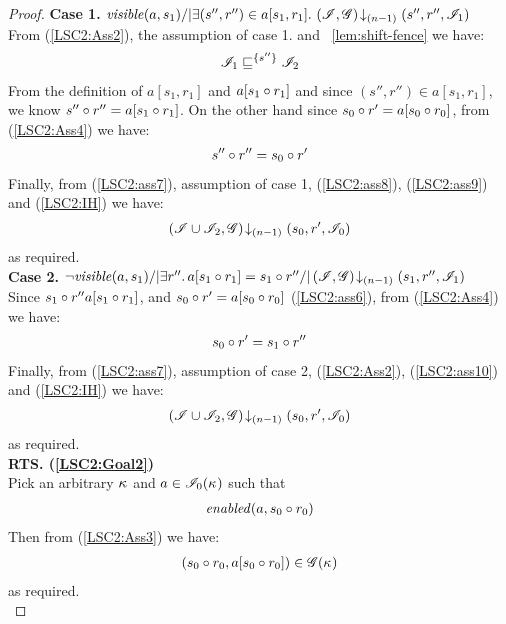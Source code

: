 \begin{lemma}
\begin{proof}
\noindent\textbf{Case 1. }
$\mathit{visible}(a, s_1) /| \exists (s'', r'') \in a[s_1, r_1].\, \left(\mathscr{I}, \mathscr{G}\right) \!\downarrow_{(n-1)} \left(s'', r'', \mathscr{I}_1\right)$\\
From (\ref{LSC2:Ass2}), the assumption of case 1. and \lem~\ref{lem:shift-fence} we have:
%
\begin{align}
	\mathscr{I}_1 \sqsubseteq^{\{s''\}} \mathscr{I}_2 \label{LSC2:ass8}
\end{align}
%
From the definition of $a[s_1, r_1]$ and $a[s_1 \circ r_1]$ and since $(s'', r'') \in a[s_1, r_1]$, we know $s'' \circ r'' = a[s_1 \circ r_1]$. On the other hand since $s_0 \circ r' = a[s_0 \circ r_0]$, from (\ref{LSC2:Ass4}) we have:
%
\begin{align}
	s'' \circ r'' = s_0 \circ r' \label{LSC2:ass9}
\end{align}
%
Finally, from (\ref{LSC2:ass7}), assumption of case 1, (\ref{LSC2:ass8}), (\ref{LSC2:ass9}) and (\ref{LSC2:IH}) we have: 
%
\begin{align*}
	\left(\mathscr{I} \cup \mathscr{I}_2, \mathscr{G}\right) \!\downarrow_{(n-1)} \left(s_0, r', \mathscr{I}_0\right)
\end{align*}
%
as required.\\

\noindent\textbf{Case 2. }
$\neg\mathit{visible}(a, s_1) /| \exists r''.\, a[s_1 \circ r_1] = s_1 \circ r'' /| \left(\mathscr{I}, \mathscr{G}\right) \!\downarrow_{(n-1)} \left(s_1, r'', \mathscr{I}_1\right)$\\
Since $s_1 \circ  r''  a[s_1 \circ r_1]$, and $s_0 \circ r' = a[s_0 \circ r_0]$ (\ref{LSC2:ass6}), from (\ref{LSC2:Ass4}) we have:
%
\begin{align}
	s_0 \circ r' = s_1 \circ r'' \label{LSC2:ass10}
\end{align}
%
Finally, from (\ref{LSC2:ass7}), assumption of case 2, (\ref{LSC2:Ass2}), (\ref{LSC2:ass10}) and (\ref{LSC2:IH}) we have: 
%
\begin{align*}
	\left(\mathscr{I} \cup \mathscr{I}_2, \mathscr{G}\right) \!\downarrow_{(n-1)} \left(s_0, r', \mathscr{I}_0\right)
\end{align*}
%
as required.\\
%
%
%
%

\noindent\textbf{RTS. (\ref{LSC2:Goal2})} \\
Pick an arbitrary $\kappa_{}$ and $a \in \mathscr{I}_0(\kappa_{})$ such that
%
\begin{align*}
	\mathit{enabled}(a, s_0 \circ r_0) 
\end{align*}
Then from (\ref{LSC2:Ass3}) we have:
%
\begin{align*}
	(s_0 \circ r_0, a[s_0 \circ r_0]) \in \mathscr{G}(\kappa_{})
\end{align*}
%
as required.\\
%
%
%
%


\end{proof}
\end{lemma}

